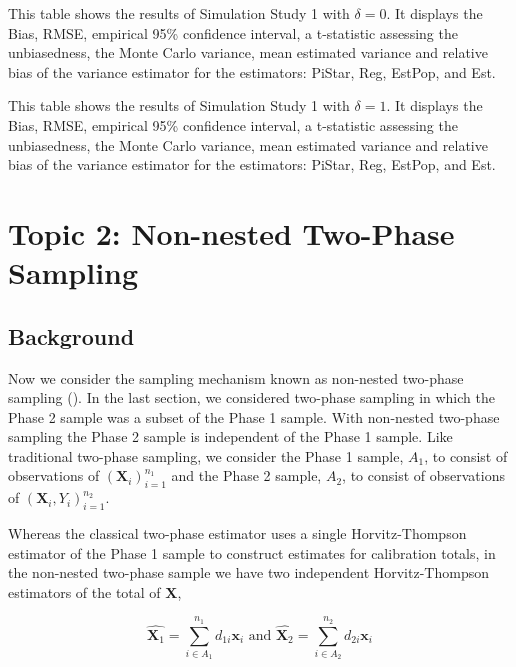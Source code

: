 \documentclass[12pt]{article}
\renewcommand{\bf}[1]{\mathbf{#1}}
\begin{document}
\begin{table}[ht!]
  \centering
  
\caption{This table shows the results of Simulation Study 1 with $\delta = 0$.
  It displays the Bias, RMSE, empirical 95\% confidence interval, a t-statistic
  assessing the unbiasedness, the Monte Carlo variance, mean estimated variance
  and relative bias of the variance estimator for the estimators: PiStar, Reg,
  EstPop, and Est.}
\label{tab:tpdc0-mean}
\end{table}

\begin{table}[ht!]
  \centering
  
\caption{This table shows the results of Simulation Study 1 with $\delta = 1$.
  It displays the Bias, RMSE, empirical 95\% confidence interval, a t-statistic
  assessing the unbiasedness, the Monte Carlo variance, mean estimated variance
  and relative bias of the variance estimator for the estimators: PiStar, Reg,
  EstPop, and Est.}
\label{tab:tpdc1-mean}
\end{table}

\section{Topic 2: Non-nested Two-Phase Sampling}

\subsection{Background}

Now we consider the sampling mechanism known as non-nested two-phase sampling 
(\cite{hidiroglou2001double}). In the last section, we considered two-phase sampling
in which the Phase 2 sample was a subset of the Phase 1 sample. With non-nested
two-phase sampling the Phase 2 sample is independent of the Phase 1 sample. 
Like traditional two-phase sampling, we consider the Phase 1 sample, $A_1$, to
consist of observations of $(\bf X_i)_{i = 1}^{n_1}$ and the Phase 2 sample,
$A_2$, to consist of observations of $(\bf X_i, Y_i)_{i = 1}^{n_2}$. 

Whereas the classical two-phase estimator uses a single Horvitz-Thompson
estimator of the Phase 1 sample to construct estimates for calibration totals,
in the non-nested two-phase sample we have two independent Horvitz-Thompson
estimators of the total of $\bf X$,

$$\hat{\bf X_1} = \sum_{i \in A_1}^{n_1} d_{1i} \bf x_i \text{ and } 
\hat{\bf X_2} = \sum_{i \in A_2}^{n_2} d_{2i} \bf x_i $$
\end{document}

